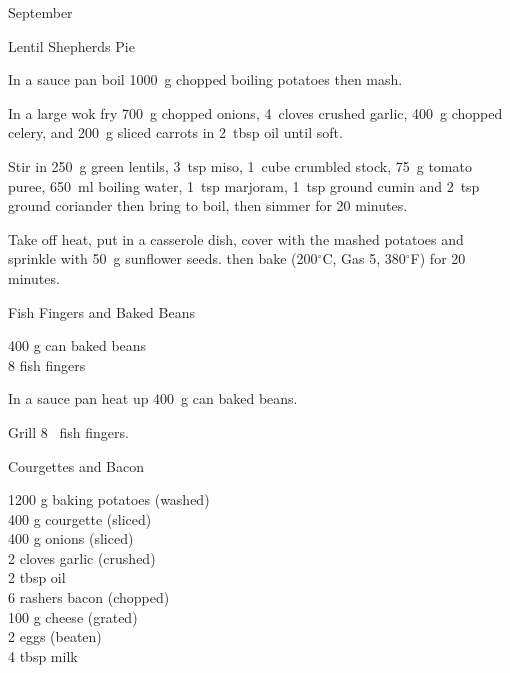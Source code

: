 \begin{menu}{September}
\begin{recipe}{2}{Lentil Shepherds Pie}
\begin{ingredients}
		\end{ingredients}
	
	
    \begin{instructions}
    \item 
        In a sauce pan boil
        1000~g chopped boiling potatoes
        then mash.
      \item 
        In a large wok fry
        700~g chopped onions,
        4~cloves crushed garlic,
        400~g chopped celery,
        and
        200~g sliced carrots
        in
        2~tbsp  oil
        until soft.
      \item 
        Stir in
        250~g  green lentils,
        3~tsp  miso,
        1~cube crumbled stock,
        75~g  tomato puree,
        650~ml  boiling water,
        1~tsp  marjoram,
        1~tsp  ground cumin
        and
        2~tsp  ground coriander
        then bring to boil,
        then simmer for 20 minutes.
      \item 
        Take off heat,
        put in a casserole dish,
        cover with the mashed potatoes
        and sprinkle with
        50~g  sunflower seeds.
        then bake (200$^{\circ}$C, Gas 5, 380$^{\circ}$F) for 20 minutes.
      
    \end{instructions}
    \end{recipe}%
  
    \begin{recipe}{1}{Fish Fingers and Baked Beans}%
		\begin{ingredients}
		400 g can baked beans  \\
	8  fish fingers  \\
	
		\end{ingredients}
	
    \begin{instructions}
    \item 
        In a sauce pan heat up
        400~g  can baked beans.
      \item 
        Grill
        8~  fish fingers.
      
    \end{instructions}
    \end{recipe}%
  
    \begin{recipe}{2}{Courgettes and Bacon}%
		\begin{ingredients}
		1200 g baking potatoes (washed) \\
	400 g courgette (sliced) \\
	400 g onions (sliced) \\
	2 cloves garlic (crushed) \\
	2 tbsp oil  \\
	6 rashers bacon (chopped) \\
	100 g cheese (grated) \\
	2  eggs (beaten) \\
	4 tbsp milk  \\
	

\end{ingredients}
\end{recipe}
\end{menu}
